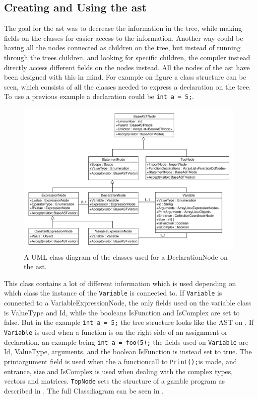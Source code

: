 \subsection{Creating and Using the \acrshort{ast}}\label{CreatingAst}

The goal for the \acrshort{ast} was to decrease the information in the tree, while making fields on the classes for easier access to the information.
Another way could be having all the nodes connected as children on the tree, but instead of running through the trees children, and looking for specific children, the compiler instead directly access different fields on the nodes instead.
All the nodes of the \acrshort{ast} have been designed with this in mind.
For example on figure  a class structure can be seen, which consists of all the classes needed to express a declaration on the tree.
To use a previous example a declaration could be \texttt{int a = 5;}.

\begin{figure}[!ht]
\centering
 \includegraphics[width=1\textwidth]{figures/ClassDiagrams/ASTDeclarationNodeMoreInfo.pdf} %
\caption{A UML class diagram of the classes used for a DeclarationNode on the \acrshort{ast}.}\label{image:ASTDecl}
\vspace{-15pt}
\end{figure}

This class contains a lot of different information which is used depending on which class the instance of the \texttt{Variable} is connected to.
If \texttt{Variable} is connected to a VariableExpressionNode, the only fields used on the variable class is ValueType and Id, while the booleans IsFunction and IsComplex are set to false.
But in the example \texttt{int a = 5;} the tree structure looks like the AST on .
If \texttt{Variable} is used when a function is on the right side of an assignment or declaration, an example being \texttt{int a = foo(5);} the fields used on \texttt{Variable} are Id, ValueType, arguments, and the boolean IsFunction is instead set to true.
The printargument field is used when the a functioncall to \texttt{Print();}is made, and entrance, size and IsComplex is used when dealing with the complex types, vectors and matrices.
\texttt{TopNode} sets the structure of a \gls{gamble} program as described in .
The full Classdiagram can be seen in .

